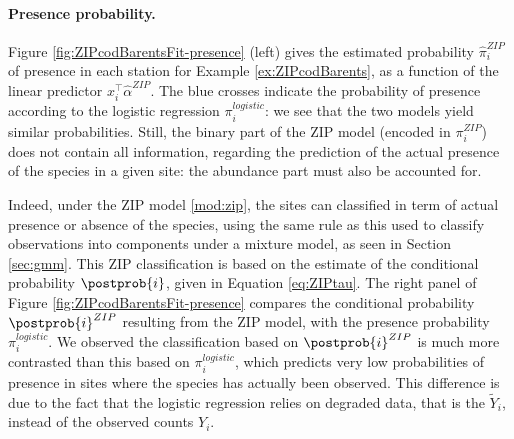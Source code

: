 \paragraph{Presence probability.}
Figure \ref{fig:ZIPcodBarentsFit-presence} (left) gives the estimated probability $\widehat{\pi}_i^{ZIP}$ of presence in each station for Example \ref{ex:ZIPcodBarents}, as a function of the linear predictor $x_i^\top \widehat{\alpha}^{ZIP}$. The blue crosses indicate the probability of presence according to the logistic regression $\pi_i^{logistic}$: we see that the two models yield similar probabilities. Still, the binary part of the ZIP model (encoded in $\pi_i^{ZIP}$) does not contain all information, regarding the prediction of the actual presence of the species in a given site: the abundance part must also be accounted for.

Indeed, under the ZIP model \eqref{mod:zip}, the sites can classified in term of actual presence or absence of the species, using the same rule as this used to classify observations into components under a mixture model, as seen in Section \ref{sec:gmm}. This ZIP classification is based on the estimate of the conditional probability $\postprob{i}$, given in Equation \eqref{eq:ZIPtau}. The right panel of Figure \ref{fig:ZIPcodBarentsFit-presence} compares the conditional probability $\postprob{i}^{ZIP}$ resulting from the ZIP model, with the presence probability $\pi_i^{logistic}$. We observed the classification based on $\postprob{i}^{ZIP}$ is much more contrasted than this based on $\pi_i^{logistic}$, which predicts very low probabilities of presence in sites where the species has actually been observed. This difference is due to the fact that the logistic regression relies on degraded data, that is the $\widetilde{Y}_i$, instead of the observed counts $Y_i$.

